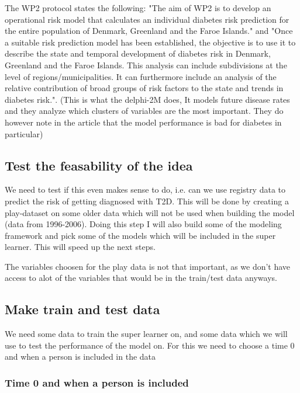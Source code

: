 \documentclass[11pt]{article}
\begin{document}
The WP2 protocol states the following:
"The aim of WP2 is to develop an operational risk model that calculates an individual diabetes risk prediction for the entire population of Denmark, Greenland and the Faroe Islands."
and
"Once a suitable risk prediction model has been established, the objective is to use it to describe the state and temporal development of diabetes risk in Denmark, Greenland and the Faroe Islands. This analysis can include subdivisions at the level of regions/municipalities. It can furthermore include an analysis of the relative contribution of broad groups of risk factors to the state and trends in diabetes risk.".
(This is what the delphi-2M does, It models future disease rates and they analyze which clusters of variables are the most important. They do however note in the article that the model performance is bad for diabetes in particular)



\subsection{Test the feasability of the idea}
\label{sec:orgffe975c}

We need to test if this even makes sense to do, i.e. can we use registry data to predict the risk of getting diagnosed with T2D. This will be done by creating a play-dataset on some older data which will not be used when building the model (data from 1996-2006). Doing this step I will also build some of the modeling framework and pick some of the models which will be included in the super learner. This will speed up the next steps.

The variables choosen for the play data is not that important, as we don't have access to alot of the variables that would be in the train/test data anyways.

\subsection{Make train and test data}
\label{sec:orged4da90}

We need some data to train the super learner on, and some data which we will use to test the performance of the model on. For this we need to choose a time 0 and when a person is included in the data

\subsubsection{Time 0 and when a person is included}
\label{sec:org96f6140}
\end{document}
